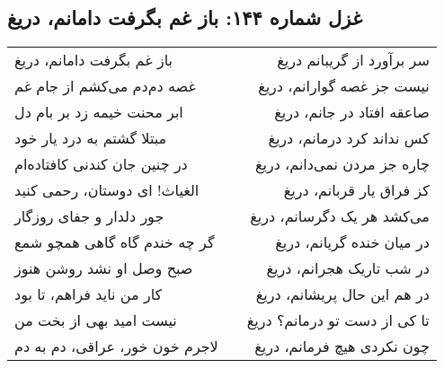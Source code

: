 \begin{center}
\section*{غزل شماره ۱۴۴: باز غم بگرفت دامانم، دریغ}
\label{sec:144}
\begin{longtable}{l p{0.5cm} r}
باز غم بگرفت دامانم، دریغ
&&
سر برآورد از گریبانم دریغ
\\
غصه دم‌دم می‌کشم از جام غم
&&
نیست جز غصه گوارانم، دریغ
\\
ابر محنت خیمه زد بر بام دل
&&
صاعقه افتاد در جانم، دریغ
\\
مبتلا گشتم به درد یار خود
&&
کس نداند کرد درمانم، دریغ
\\
در چنین جان کندنی کافتاده‌ام
&&
چاره جز مردن نمی‌دانم، دریغ
\\
الغیاث! ای دوستان، رحمی کنید
&&
کز فراق یار قربانم، دریغ
\\
جور دلدار و جفای روزگار
&&
می‌کشد هر یک دگرسانم، دریغ
\\
گر چه خندم گاه گاهی همچو شمع
&&
در میان خنده گریانم، دریغ
\\
صبح وصل او نشد روشن هنوز
&&
در شب تاریک هجرانم، دریغ
\\
کار من ناید فراهم، تا بود
&&
در هم این حال پریشانم، دریغ
\\
نیست امید بهی از بخت من
&&
تا کی از دست تو درمانم؟ دریغ
\\
لاجرم خون خور، عراقی، دم به دم
&&
چون نکردی هیچ فرمانم، دریغ
\\
\end{longtable}
\end{center}
